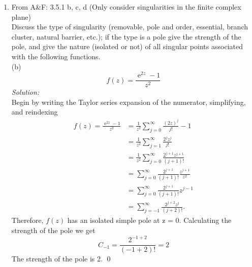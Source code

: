 \documentclass[10pt]{amsart}
\DeclareMathOperator{\E}{e}
\theoremstyle{nonumberplain}
\begin{document}
\mline
\begin{enumerate}[label={\bf {\arabic*}:}]
\item  From A\&F: 3.5.1 b, c, d (Only consider singularities in the finite
  complex plane) \\
Discuss the type of singularity (removable, pole and order, essential, branch cluster, natural barrier, etc.); if the type is a pole give the strength of the pole,  and give the nature (isolated or not) of all singular points associated with the following functions. \\

\noindent
(b)
$$
f(z) = \frac {\E^{2z} - 1} {z^2}
$$
\textit{Solution:} \\
Begin by writing the Taylor series expansion of the numerator, simplifying, and reindexing
\begin{align*}
f(z) = \frac {\E^{2z} - 1} {z^2} &= \frac 1 {z^2} \sum_{j=0}^\infty \frac{(2z)^j} {j!} - 1 \\
	&= \frac 1 {z^2} \sum_{j=1}^\infty \frac{2^jz^j} {j!} \\
	&= \frac 1 {z^2} \sum_{j=0}^\infty \frac{2^{j + 1}z^{j + 1}} {(j + 1)!} \\
	&= \sum_{j=0}^\infty \frac{2^{j + 1}} {(j + 1)!} \frac {z^{j + 1}}{z^2} \\
	&= \sum_{j=0}^\infty \frac{2^{j + 1}} {(j + 1)!} z^{j - 1} \\
	&= \sum_{j=-1}^\infty \frac{2^{j + 2}z^j} {(j + 2)!}.
\end{align*}
Therefore, $f(z)$ has an isolated simple pole at z = 0.
Calculating the strength of the pole we get
$$C_{-1} = \frac{2^{-1 + 2}} {(-1 + 2)!} = 2$$
The strength of the pole is 2.
\qed \\


\end{enumerate}
\end{document}

